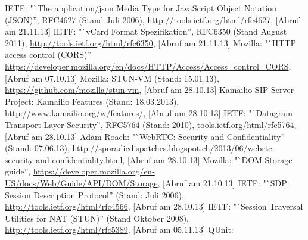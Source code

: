 


%
%


\begin{thebibliography}{literatur}
	 IETF: 
		"`The application/json Media Type for JavaScript Object Notation (JSON)'', RFC4627 (Stand Juli 2006),
		\hyperlink{http://tools.ietf.org/html/rfc4627}{http://tools.ietf.org/html/rfc4627}, 
		[Abruf am 21.11.13]
	 IETF: 
		"`vCard Format Spezifikation'', RFC6350 (Stand August 2011),
		\hyperlink{http://tools.ietf.org/html/rfc6350}{http://tools.ietf.org/html/rfc6350}, 
		[Abruf am 21.11.13]
	 Mozilla: 
		"`HTTP access control (CORS)'' 
		\hyperlink{https://developer.mozilla.org/en/docs/HTTP/Access_control_CORS}{https://developer.mozilla.org/en/docs/HTTP/Access/Access\_control\_CORS}, 
		[Abruf am 07.10.13]
	 Mozilla: 
		STUN-VM (Stand: 15.01.13), 
		\hyperlink{https://github.com/mozilla/stun-vm}{https://github.com/mozilla/stun-vm},
		[Abruf am 28.10.13]
	 Kamailio SIP Server Project: 
		Kamailio Features (Stand: 18.03.2013), 
		\hyperlink{http://www.kamailio.org/w/features/}{http://www.kamailio.org/w/features/}, 
		[Abruf am 28.10.13]
	 IETF: 
		"`Datagram Transport Layer Security'', RFC5764 (Stand: 2010), 
		\hyperlink{http://tools.ietf.org/html/rfc5764}{tools.ietf.org/html/rfc5764}, 
		[Abruf am 28.10.13]
	 Adam Roach: 
		"`WebRTC: Security and Confidentiality'' (Stand: 07.06.13), 
		\hyperlink{http://sporadicdispatches.blogspot.ch/2013/06/webrtc-security-and-confidentiality.html}{http://sporadicdispatches.blogspot.ch/2013/06/webrtc-security-and-confidentiality.html}, 
		[Abruf am 28.10.13]
	 Mozilla: 
		"`DOM Storage guide'',
		\hyperlink{https://developer.mozilla.org/en-US/docs/Web/Guide/API/DOM/Storage}{https://developer.mozilla.org/en-US/docs/Web/Guide/API/DOM/Storage},
		[Abruf am 21.10.13]
	 IETF:
		"`SDP: Session Description Protocol'' (Stand: Juli 2006),
		\hyperlink{http://tools.ietf.org/html/rfc4566}{http://tools.ietf.org/html/rfc4566},
		[Abruf am 28.10.13]
	 IETF:
		"`Session Traversal Utilities for NAT (STUN)'' (Stand Oktober 2008),
		\hyperlink{http://tools.ietf.org/html/rfc5389}{http://tools.ietf.org/html/rfc5389},
		[Abruf am 05.11.13]
	 QUnit: %

\end{thebibliography}
